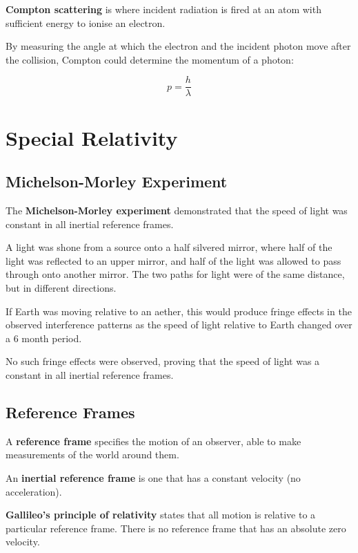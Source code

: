 \documentclass[a4paper,11pt]{report}
\begin{document}
\textbf{Compton scattering} is where incident radiation is fired at an atom
with sufficient energy to ionise an electron.

By measuring the angle at which the electron and the incident photon move after
the collision, Compton could determine the momentum of a photon:

$$
p = \frac{h}{\lambda}
$$



\chapter{Special Relativity}

\section{Michelson-Morley Experiment}


The \textbf{Michelson-Morley experiment} demonstrated that the speed of light
was constant in all inertial reference frames.

A light was shone from a source onto a half silvered mirror, where half of the
light was reflected to an upper mirror, and half of the light was allowed to
pass through onto another mirror. The two paths for light were of the same
distance, but in different directions.

If Earth was moving relative to an aether, this would produce fringe effects
in the observed interference patterns as the speed of light relative to Earth
changed over a 6 month period.

No such fringe effects were observed, proving that the speed of light was
a constant in all inertial reference frames.


\section{Reference Frames}

A \textbf{reference frame} specifies the motion of an observer, able to make
measurements of the world around them.

An \textbf{inertial reference frame} is one that has a constant velocity (no
acceleration).

\textbf{Gallileo's principle of relativity} states that all motion is relative
to a particular reference frame. There is no reference frame that has an
absolute zero velocity.
\end{document}
